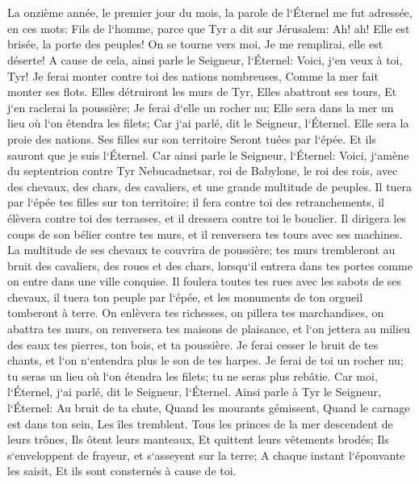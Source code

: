 \chapter{}

\verse La onzième année, le premier jour du mois, la parole de l`Éternel me fut adressée, en ces mots: 
\verse Fils de l`homme, parce que Tyr a dit sur Jérusalem: Ah! ah! Elle est brisée, la porte des peuples! On se tourne vers moi, Je me remplirai, elle est déserte! 
\verse A cause de cela, ainsi parle le Seigneur, l`Éternel: Voici, j`en veux à toi, Tyr! Je ferai monter contre toi des nations nombreuses, Comme la mer fait monter ses flots. 
\verse Elles détruiront les murs de Tyr, Elles abattront ses tours, Et j`en raclerai la poussière; Je ferai d`elle un rocher nu; 
\verse Elle sera dans la mer un lieu où l`on étendra les filets; Car j`ai parlé, dit le Seigneur, l`Éternel. Elle sera la proie des nations. 
\verse Ses filles sur son territoire Seront tuées par l`épée. Et ils sauront que je suis l`Éternel. 
\verse Car ainsi parle le Seigneur, l`Éternel: Voici, j`amène du septentrion contre Tyr Nebucadnetsar, roi de Babylone, le roi des rois, avec des chevaux, des chars, des cavaliers, et une grande multitude de peuples. 
\verse Il tuera par l`épée tes filles sur ton territoire; il fera contre toi des retranchements, il élèvera contre toi des terrasses, et il dressera contre toi le bouclier. 
\verse Il dirigera les coups de son bélier contre tes murs, et il renversera tes tours avec ses machines. 
\verse La multitude de ses chevaux te couvrira de poussière; tes murs trembleront au bruit des cavaliers, des roues et des chars, lorsqu`il entrera dans tes portes comme on entre dans une ville conquise. 
\verse Il foulera toutes tes rues avec les sabots de ses chevaux, il tuera ton peuple par l`épée, et les monuments de ton orgueil tomberont à terre. 
\verse On enlèvera tes richesses, on pillera tes marchandises, on abattra tes murs, on renversera tes maisons de plaisance, et l`on jettera au milieu des eaux tes pierres, ton bois, et ta poussière. 
\verse Je ferai cesser le bruit de tes chants, et l`on n`entendra plus le son de tes harpes. 
\verse Je ferai de toi un rocher nu; tu seras un lieu où l`on étendra les filets; tu ne seras plus rebâtie. Car moi, l`Éternel, j`ai parlé, dit le Seigneur, l`Éternel. 
\verse Ainsi parle à Tyr le Seigneur, l`Éternel: Au bruit de ta chute, Quand les mourants gémissent, Quand le carnage est dans ton sein, Les îles tremblent. 
\verse Tous les princes de la mer descendent de leurs trônes, Ils ôtent leurs manteaux, Et quittent leurs vêtements brodés; Ils s`enveloppent de frayeur, et s`asseyent sur la terre; A chaque instant l`épouvante les saisit, Et ils sont consternés à cause de toi. 
